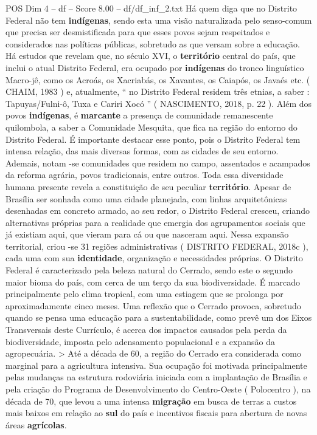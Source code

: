 \begin{textsample}{POS Dim 4 – df – Score 8.00 – df/df\_inf\_2.txt}
Há quem diga que no Distrito Federal não tem \textbf{indígenas}, sendo esta uma visão naturalizada pelo senso-comum que precisa ser desmistificada para que esses povos sejam respeitados e considerados nas políticas públicas, sobretudo as que versam sobre a educação.
Há estudos que revelam que, no século XVI, o \textbf{território} central do país, que inclui o atual Distrito Federal, era ocupado por \textbf{indígenas} do tronco linguístico Macro-jê, como os Acroás, os Xacriabás, os Xavantes, os Caiapós, os Javaés etc. ( CHAIM, 1983 ) e, atualmente, “ no Distrito Federal residem três etnias, a saber : Tapuyas/Fulni-ô, Tuxa e Cariri Xocó ” ( NASCIMENTO, 2018, p. 22 ).
Além dos povos \textbf{indígenas}, é \textbf{marcante} a presença de comunidade remanescente quilombola, a saber a Comunidade Mesquita, que fica na região do entorno do Distrito Federal.
É importante destacar esse ponto, pois o Distrito Federal tem intensa relação, das mais diversas formas, com as cidades de seu entorno.
Ademais, notam -se comunidades que residem no campo, assentados e acampados da reforma agrária, povos tradicionais, entre outros.
Toda essa diversidade humana presente revela a constituição de seu peculiar \textbf{território}.
Apesar de Brasília ser sonhada como uma cidade planejada, com linhas arquitetônicas desenhadas em concreto armado, ao seu redor, o Distrito Federal cresceu, criando alternativas próprias para a realidade que emergia dos agrupamentos sociais que já existiam aqui, que vieram para cá ou que nasceram aqui.
Nessa expansão territorial, criou -se 31 regiões administrativas ( DISTRITO FEDERAL, 2018c ), cada uma com sua \textbf{identidade}, organização e necessidades próprias.
O Distrito Federal é caracterizado pela beleza natural do Cerrado, sendo este o segundo maior bioma do país, com cerca de um terço da sua biodiversidade.
É marcado principalmente pelo clima tropical, com uma estiagem que se prolonga por aproximadamente cinco meses.
Uma reflexão que o Cerrado provoca, sobretudo quando se pensa uma educação para a sustentabilidade, como prevê um dos Eixos Transversais deste Currículo, é acerca dos impactos causados pela perda da biodiversidade, imposta pelo adensamento populacional e a expansão da agropecuária. > Até a década de 60, a região do Cerrado era considerada como marginal para a agricultura intensiva.
Sua ocupação foi motivada principalmente pelas mudanças na estrutura rodoviária iniciada com a implantação de Brasília e pela criação do Programa de Desenvolvimento do Centro-Oeste ( Polocentro ), na década de 70, que levou a uma intensa \textbf{migração} em busca de terras a custos mais baixos em relação ao \textbf{sul} do país e incentivos fiscais para abertura de novas áreas \textbf{agrícolas}.

\end{textsample}
